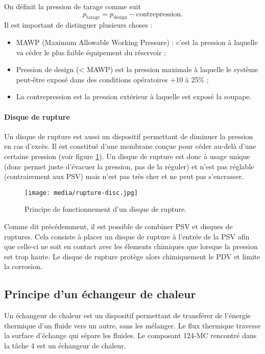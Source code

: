On définit la pression de tarage comme suit
\[ p_{\text{tarage}} = p_{\text{design}} - \text{contrepression}.\]
Il est important de distinguer plusieurs choses :
\begin{itemize}
	\item MAWP (Maximum Allowable Working Pressure) : c'est
	la pression à laquelle va céder le plus faible équipement
	du réservoir ;
	\item Pression de design (< MAWP) est la pression maximale
	à laquelle le système peut-être exposé dans des conditions
	opératoires +10 à 25\% ;
	\item La contrepression est la pression extérieur à
	laquelle est exposé la soupape.
\end{itemize}

\paragraph{Disque de rupture}
Un disque de rupture est aussi un dispositif
permettant de diminuer la pression en cas d'excès.
Il est constitué d'une membrane conçue pour céder
au-delà d'une certaine pression 
(voir figure \ref{fig:rupture-disc}). Un disque
de rupture est donc à usage unique (donc permet juste
d'évacuer la pression, pas de la réguler) et n'est pas
réglable (contrairement aux PSV) mais n'est pas
très cher et ne peut pas s'encrasser.

\begin{figure}[ht]
	\centering
	\texttt{[image: media/rupture-disc.jpg]}
	\caption{Principe de fonctionnement d'un disque de rupture.}
	\label{fig:rupture-disc}
\end{figure}

Comme dit précédemment, il est possible de combiner
PSV et disques de ruptures. Cela consiste à
placer un disque de rupture à l'entrée de la PSV
afin que celle-ci ne soit en contact avec les élements
chimiques que lorsque la pression est trop haute. Le
disque de rupture protège alors chimiquement le PDV et
limite la corrosion.

\subsection{Principe d'un échangeur de chaleur}
Un échangeur de chaleur est un dispositif permettant
de transférer de l'énergie thermique d'un fluide
vers un autre, sans les mélanger. Le flux thermique
traverse la surface d'échange qui sépare les fluides.
Le composant 124-MC rencontré dans la tâche 4 est un
échangeur de chaleur.

